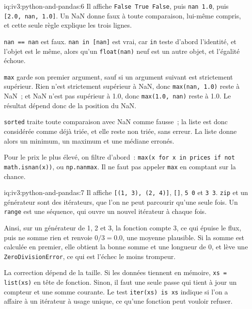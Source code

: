 \begin{solution}{iq:iv3:python-and-pandas:6}
Il affiche \texttt{False True False}, puis \texttt{nan 1.0}, puis \texttt{[2.0, nan, 1.0]}. Un NaN donne faux à toute comparaison, lui-même compris, et cette seule règle explique les trois lignes.

\texttt{nan == nan} est faux. \texttt{nan in [nan]} est vrai, car \texttt{in} teste d'abord l'identité, et l'objet est le même, alors qu'un \texttt{float(\textquotesingle nan\textquotesingle)} neuf est un autre objet, et l'égalité échoue.

\texttt{max} garde son premier argument, sauf si un argument suivant est strictement supérieur. Rien n'est strictement supérieur à NaN, donc \texttt{max(nan, 1.0)} reste à NaN~; et NaN n'est pas supérieur à 1.0, donc \texttt{max(1.0, nan)} reste à 1.0. Le résultat dépend donc de la position du NaN.

\texttt{sorted} traite toute comparaison avec NaN comme fausse~; la liste est donc considérée comme déjà triée, et elle reste non triée, sans erreur. La liste donne alors un minimum, un maximum et une médiane erronés.

Pour le prix le plus élevé, on filtre d'abord~: \texttt{max(x for x in prices if not math.isnan(x))}, ou \texttt{np.nanmax}. Il ne faut pas appeler \texttt{max} en comptant sur la chance.

\end{solution}

\begin{solution}{iq:iv3:python-and-pandas:7}
Il affiche \texttt{[(1, 3), (2, 4)]}, \texttt{[]}, \texttt{5 0} et \texttt{3 3}. \texttt{zip} et un générateur sont des itérateurs, que l'on ne peut parcourir qu'une seule fois. Un \texttt{range} est une séquence, qui ouvre un nouvel itérateur à chaque fois.

Ainsi, sur un générateur de 1, 2 et 3, la fonction compte 3, ce qui épuise le flux, puis ne somme rien et renvoie $0 / 3 = 0.0$, une moyenne plausible. Si la somme est calculée en premier, elle obtient la bonne somme et une longueur de 0, et lève une \texttt{ZeroDivisionError}, ce qui est l'échec le moins trompeur.

La correction dépend de la taille. Si les données tiennent en mémoire, \texttt{xs = list(xs)} en tête de fonction. Sinon, il faut une seule passe qui tient à jour un compteur et une somme courante. Le test \texttt{iter(xs) is xs} indique si l'on a affaire à un itérateur à usage unique, ce qu'une fonction peut vouloir refuser.

\end{solution}

